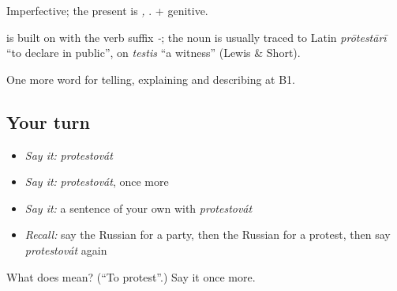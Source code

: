 Imperfective; the present is \emph{, }. \emph{ } + genitive.

\begin{cousinweb}
\textbf{} is built on \emph{} with the verb suffix \emph{-}; the noun is usually traced to Latin \emph{prōtestārī} \textquotedblleft{}to declare in public\textquotedblright{}, on \emph{testis} \textquotedblleft{}a witness\textquotedblright{} (Lewis \& Short).
\end{cousinweb}

\begin{grammarlens}[title={What you've built}]
One more word for telling, explaining and describing at B1.
\end{grammarlens}

\subsection*{Your turn}
\begin{itemize}
\raggedright
  \item \emph{Say it:} \emph{protestovát}
  \item \emph{Say it:} \emph{protestovát}, once more
  \item \emph{Say it:} a sentence of your own with \emph{protestovát}
  \item \emph{Recall:} say the Russian for a party, then the Russian for a protest, then say \emph{protestovát} again
\end{itemize}

\begin{tcolorbox}[breakable,colback=teal!4,colframe=teal!35!black,title={Before you move on}]
What does  mean? (\textquotedblleft{}To protest\textquotedblright{}.) Say it once more.
\end{tcolorbox}

